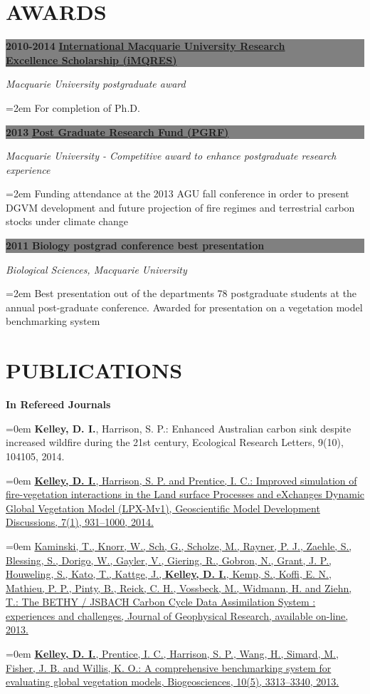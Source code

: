 \documentclass[paper=a4,fontsize=11pt]{scrartcl}	 			%
\newcommand{\sepspace}{\vspace*{0em}}			%
\newcommand{\NewPart}[1]{\vspace*{-0.5em} \section*{\uppercase{#1}} \vspace*{-0.75em} }
\newcommand{\EducationEntry}[4]{ \vspace*{0.7em}
		\noindent \colorbox{gray}{%
			\parbox{46em}{%
			\color{Black}\textbf{#2} \hspace{0.5cm} \textbf{#1}}} 				%
		\vspace*{-1em}
		\hfill 	\par				%
		\noindent \textit{#3} \par					%
		\noindent\hangindent=2em\hangafter=0 \small #4 	%
		\normalsize \par}
\newcommand{\BibEntry}[2]{
		\vspace*{-1em} \noindent \textbf{#1} \hfill \par					%
		\hangindent=0em\hangafter=0 \small #2} 	%
\begin{document}
  
\NewPart{Awards}
\EducationEntry{\href{http://www.hdr.mq.edu.au/information_about/scholarships}{International Macquarie University Research \\ Excellence Scholarship (iMQRES)}}{2010-2014} {\newline Macquarie University postgraduate award}{For completion of Ph.D.}
\sepspace

\EducationEntry{\href{http://www.hdr.mq.edu.au/information_for/current_candidates/financial_support}{Post Graduate Research Fund (PGRF)}}{2013} {Macquarie University - Competitive award to enhance postgraduate research experience}{Funding attendance at the 2013 AGU fall conference in order to present DGVM development and future projection of fire regimes and terrestrial carbon stocks under climate change}
\sepspace

\EducationEntry{Biology postgrad conference best presentation}{2011} {Biological Sciences, Macquarie University}{Best presentation out of the departments 78 postgraduate students at the annual post-graduate conference. Awarded for presentation on a vegetation model benchmarking system}
  

\NewPart{Publications}

\BibEntry{\newline In Refereed Journals}{\textbf{Kelley, D. I.}, Harrison, S. P.: Enhanced Australian carbon sink despite increased wildfire during the 21st century, Ecological Research Letters, 9(10), 104105, 2014.}

\BibEntry{}{\href{http://www.geosci-model-dev-discuss.net/7/931/2014/gmdd-7-931-2014.html}{\textbf{Kelley, D. I.}, Harrison, S. P. and Prentice, I. C.: Improved simulation of fire-vegetation interactions in the Land surface Processes and eXchanges Dynamic Global Vegetation Model (LPX-Mv1), Geoscientific Model Development Discussions, 7(1), 931--1000, 2014.}}

\BibEntry{} {\href{http://onlinelibrary.wiley.com/doi/10.1002/jgrg.20118/abstract}{Kaminski, T., Knorr, W., Sch, G., Scholze, M., Rayner, P. J., Zaehle, S., Blessing, S., Dorigo, W., Gayler, V., Giering, R., Gobron, N., Grant, J. P., Houweling, S., Kato, T., Kattge, J., \textbf{Kelley, D. I.}, Kemp, S., Koffi, E. N., Mathieu, P. P., Pinty, B., Reick, C. H., Vossbeck, M., Widmann, H. and Ziehn, T.: The BETHY / JSBACH Carbon Cycle Data Assimilation System : experiences and challenges, Journal of Geophysical Research, available on-line, 2013.}}


\BibEntry{} {\href{http://www.biogeosciences.net/10/3313/2013/bg-10-3313-2013.html}{\textbf{Kelley, D. I.}, Prentice, I. C., Harrison, S. P., Wang, H., Simard, M., Fisher, J. B. and Willis, K. O.: A comprehensive benchmarking system for evaluating global vegetation models, Biogeosciences, 10(5), 3313--3340, 2013.}}
\end{document}
